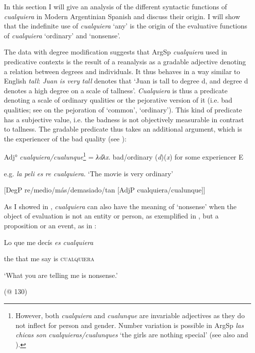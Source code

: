 \documentclass[output=paper]{langscibook}
\begin{document}
In this section I will give an analysis of the different syntactic functions of \textit{cualquiera} in Modern Argentinian Spanish and discuss their origin. I will show that the indefinite use of \textit{cualquiera} ‘any’ is the origin of the evaluative functions of \textit{cualquiera} ‘ordinary’ and ‘nonsense’.

  The data with degree modification suggests that ArgSp \textit{cualquiera} used in predicative contexts is the result of a reanalysis as a gradable adjective denoting a relation between degrees and individuals. It thus behaves in a way similar to English \textit{tall}: \textit{Juan is very tall} denotes that ‘Juan is tall to degree d, and degree d denotes a high degree on a scale of tallness’. \textit{Cualquiera} is thus a predicate denoting a scale of ordinary qualities or the pejorative version of it (i.e. bad qualities; see  on the pejoration of ‘common’, ‘ordinary’). This kind of predicate has a subjective value, i.e. the badness is not objectively measurable in contrast to tallness. The gradable predicate thus takes an additional argument, which is the experiencer of the bad quality (see ):

    Adj° \textit{cualquiera/cualunque}\footnote{ \textrm{However, both} \textrm{\textit{cualquiera}} \textrm{and} \textrm{\textit{cualunque}} \textrm{are invariable adjectives as they do not inflect for person and gender. Number variation is possible in ArgSp} \textrm{\textit{las chicas son cualquieras/cualunques}} \textrm{‘the girls are nothing special’ (see also \citealt{Rainer1993} and ).}} = \textit{λdλx}. bad/ordinary (\textit{d})(\textit{x}) for some experiencer E

e.g. \textit{la peli es re cualquiera}. ‘The movie is very ordinary’

    [DegP re/medio/más/demasiado/tan [AdjP cualquiera/cualunque]]

As I showed in , \textit{cualquiera} can also have the meaning of ‘nonsense’ when the object of evaluation is not an entity or person, as exemplified in , but a proposition or an event, as in :

    Lo  que  me  decís  \textit{es  cualquiera}

    the  that  me  say  is  \textsc{cualquiera}

    ‘What you are telling me is nonsense.’

    (@ 130)
\end{document}

